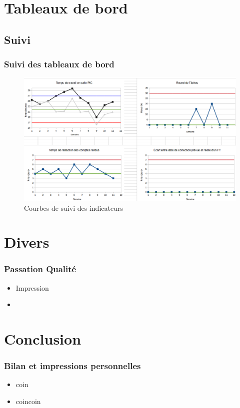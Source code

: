 \documentclass[compress,xcolor=dvipsnames]{beamer}
\begin{document}
\section{Tableaux de bord}
\subsection{Suivi}
\begin{frame}
\frametitle{Suivi des tableaux de bord}
\begin{center}
			\begin{figure}
				\includegraphics[scale=0.21]{./images/TB.png}
				\caption{Courbes de suivi des indicateurs}
			\end{figure}
		\end{center}
\end{frame}	


\section{Divers}
\begin{frame}
\frametitle{Passation Qualité}
\begin{itemize}
\item Impression 
\item 
\end{itemize}
\end{frame}


\section{Conclusion}
\begin{frame}
\frametitle{Bilan et impressions personnelles}
\begin{itemize}
\item coin
\item coincoin
\end{itemize}
\end{frame}
\end{document}
